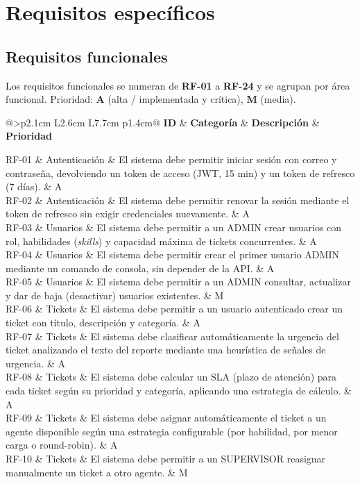 \documentclass[11pt,a4paper]{article}
\makeatletter
\newcommand{\reqtable}[1]{%
  \begin{longtable}{@{}>{\bfseries}p{2.1cm} L{2.6cm} L{7.7cm} p{1.4cm}@{}}
  \toprule
  \textbf{ID} & \textbf{Categoría} & \textbf{Descripción} & \textbf{Prioridad} \\
  \midrule
  \endhead
  #1
  \bottomrule
  \end{longtable}
}
\makeatother
\begin{document}
\section{Requisitos específicos}

\subsection{Requisitos funcionales}

Los requisitos funcionales se numeran de \textbf{RF-01} a \textbf{RF-24} y se
agrupan por área funcional. Prioridad: \textbf{A} (alta / implementada y
crítica), \textbf{M} (media).

\reqtable{
RF-01 & Autenticación & El sistema debe permitir iniciar sesión con correo y contraseña, devolviendo un token de acceso (JWT, 15 min) y un token de refresco (7 días). & A \\
RF-02 & Autenticación & El sistema debe permitir renovar la sesión mediante el token de refresco sin exigir credenciales nuevamente. & A \\
RF-03 & Usuarios & El sistema debe permitir a un ADMIN crear usuarios con rol, habilidades (\emph{skills}) y capacidad máxima de tickets concurrentes. & A \\
RF-04 & Usuarios & El sistema debe permitir crear el primer usuario ADMIN mediante un comando de consola, sin depender de la API. & A \\
RF-05 & Usuarios & El sistema debe permitir a un ADMIN consultar, actualizar y dar de baja (desactivar) usuarios existentes. & M \\
RF-06 & Tickets & El sistema debe permitir a un usuario autenticado crear un ticket con título, descripción y categoría. & A \\
RF-07 & Tickets & El sistema debe clasificar automáticamente la urgencia del ticket analizando el texto del reporte mediante una heurística de señales de urgencia. & A \\
RF-08 & Tickets & El sistema debe calcular un SLA (plazo de atención) para cada ticket según su prioridad y categoría, aplicando una estrategia de cálculo. & A \\
RF-09 & Tickets & El sistema debe asignar automáticamente el ticket a un agente disponible según una estrategia configurable (por habilidad, por menor carga o round-robin). & A \\
RF-10 & Tickets & El sistema debe permitir a un SUPERVISOR reasignar manualmente un ticket a otro agente. & M \\
}
\end{document}
